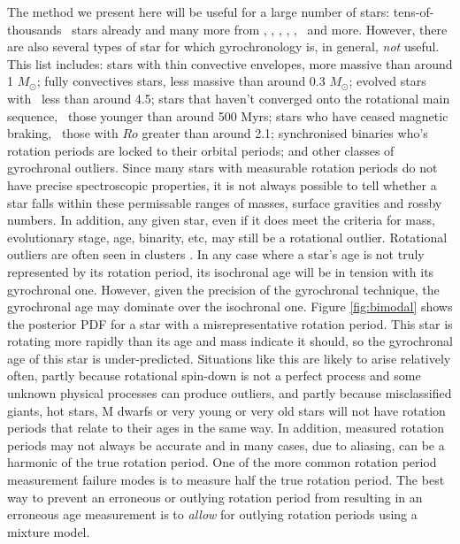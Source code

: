 The method we present here will be useful for a large number of stars:
tens-of-thousands \kepler\ stars already and many more from
\tess, \lsst, \wfirst, \plato, \gaia, \panstarrs\ and more.
However, there are also several types of star for which gyrochronology is, in
general, {\it not} useful.
This list includes: stars with thin convective envelopes, more massive than
around 1 $M_\odot$; fully convectives stars, less massive than around 0.3
$M_\odot$; evolved stars with \logg\ less than around 4.5; stars that haven't
converged onto the rotational main sequence, \ie\ those younger than around
500 Myrs; stars who have ceased magnetic braking, \ie\ those with $Ro$ greater
than around 2.1; synchronised binaries who's rotation periods are locked to
their orbital periods; and other classes of gyrochronal outliers.
Since many stars with measurable rotation periods do not have precise
spectroscopic properties, it is not always possible to tell whether a star
falls within these permissable ranges of masses, surface gravities and rossby
numbers.
In addition, any given star, even if it does meet the criteria for mass,
evolutionary stage, age, binarity, etc, may still be a rotational outlier.
Rotational outliers are often seen in clusters \citep[see \eg][]{douglas}.
In any case where a star's age is not truly represented by its rotation
period, its isochronal age will be in tension with its gyrochronal one.
However, given the precision of the gyrochronal technique, the gyrochronal
age may dominate over the isochronal one.
Figure \ref{fig:bimodal} shows the posterior PDF for a star with a
misrepresentative rotation period.
This star is rotating more rapidly than its age and mass indicate it should,
so the gyrochronal age of this star is under-predicted.
Situations like this are likely to arise relatively often, partly because
rotational spin-down is not a perfect process and some unknown physical
processes can produce outliers, and partly because misclassified giants, hot
stars, M dwarfs or very young or very old stars will not have rotation periods
that relate to their ages in the same way.
In addition, measured rotation periods may not always be accurate and in many
cases, due to aliasing, can be a harmonic of the true rotation period.
One of the more common rotation period measurement failure modes is to measure
half the true rotation period.
The best way to prevent an erroneous or outlying rotation period from
resulting in an erroneous age measurement is to {\it allow} for outlying
rotation periods using a mixture model.

